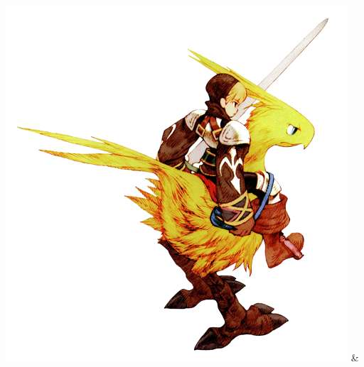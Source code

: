 %
\vfill
\includegraphics[width=\columnwidth]{./art/worldbook/chocoborider.jpg}
%
\clearpage
%
%
\newcommand{\nlwb}{\vspace{0.2cm}\\}
%
{ & }
